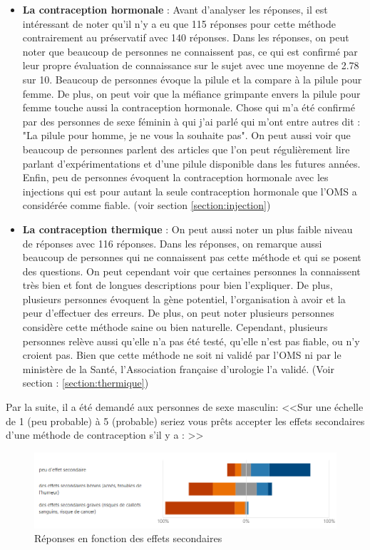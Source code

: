 \documentclass[12pt,a4paper]{report}
\begin{document}
\begin{itemize}
    \item \textbf{La contraception hormonale} : Avant d'analyser les réponses, il est intéressant de noter qu'il n'y a eu que 115 réponses pour cette méthode contrairement au préservatif avec 140 réponses. Dans les réponses, on peut noter que beaucoup de personnes ne connaissent pas, ce qui est confirmé par leur propre évaluation de connaissance sur le sujet avec une moyenne de 2.78 sur 10. Beaucoup de personnes évoque la pilule et la compare à la pilule pour femme. De plus, on peut voir que la méfiance grimpante envers la pilule pour femme \cite{albrechtQuelleEstPlace2023} touche aussi la contraception hormonale. Chose qui m'a été confirmé par des personnes de sexe féminin à qui j'ai parlé qui m'ont entre autres dit : "La pilule pour homme, je ne vous la souhaite pas". On peut aussi voir que beaucoup de personnes parlent des articles que l'on peut régulièrement lire parlant d'expérimentations et d'une pilule disponible dans les futures années. Enfin, peu de personnes évoquent la contraception hormonale avec les injections qui est pour autant la seule contraception hormonale que l'OMS a considérée comme fiable. (voir section \ref{section:injection})

    \item \textbf{La contraception thermique} : On peut aussi noter un plus faible niveau de réponses avec 116 réponses. Dans les réponses, on remarque aussi beaucoup de personnes qui ne connaissent pas cette méthode et qui se posent des questions. On peut cependant voir que certaines personnes la connaissent très bien et font de longues descriptions pour bien l'expliquer. De plus, plusieurs personnes évoquent la gène potentiel, l'organisation à avoir et la peur d'effectuer des erreurs. De plus, on peut noter plusieurs personnes considère cette méthode saine ou bien naturelle. Cependant, plusieurs personnes relève aussi qu'elle n'a pas été testé, qu'elle n'est pas fiable, ou n'y croient pas. Bien que cette méthode ne soit ni validé par l'OMS ni par le ministère de la Santé, l'Association française d'urologie l'a validé. (Voir section : \ref{section:thermique})
    
\end{itemize}

Par la suite, il a été demandé aux personnes de sexe masculin: <<Sur une échelle de 1 (peu probable) à 5 (probable) seriez vous prêts accepter les effets secondaires d'une méthode de contraception s'il y a : >>

\begin{figure}[H]
    \centering
    \includegraphics[width=1\textwidth]{images/questionnaire/Acceptation effets secondaires.png}
    \caption{Réponses en fonction des effets secondaires}
    \label{fig:reponse_effets_secondaires}
\end{figure}
\end{document}
